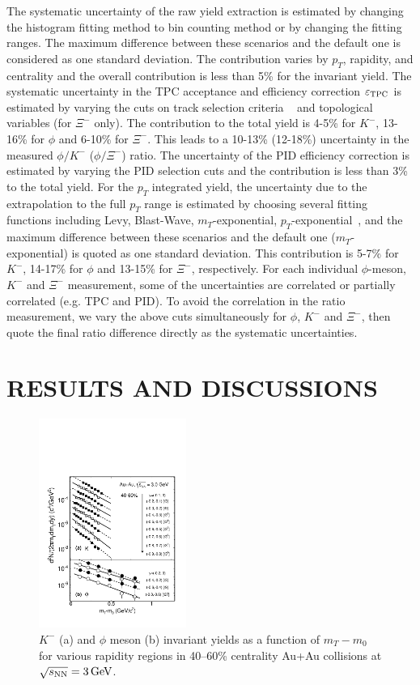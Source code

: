 \documentclass[aps,tightenlines,superscriptaddress,twocolumn]{revtex4-1}
\begin{document}
The systematic uncertainty of the raw yield extraction is estimated by changing the histogram fitting method to bin counting method or by changing the fitting ranges. The maximum difference between these scenarios and the default one is considered as one standard deviation. The contribution varies by $p_T$, rapidity, and centrality and the overall contribution is less than 5\% for the invariant yield. The systematic uncertainty in the TPC acceptance and efficiency correction $\varepsilon_{\rm TPC}$ is estimated by varying the cuts on track selection criteria ~\cite{Adamczyk:2017iwn} and topological variables (for $\Xi^-$ only). The contribution to the total yield is 4-5\% for $K^-$, 13-16\% for $\phi$ and 6-10\% for $\Xi^-$. This leads to a 10-13\% (12-18\%) uncertainty in the measured $\phi/K^-$ ($\phi/\Xi^-$) ratio. The uncertainty of the PID efficiency correction is estimated by varying the PID selection cuts and the contribution is less than 3\% to the total yield.
For the $p_T$ integrated yield, the uncertainty due to the extrapolation to the full $p_T$ range is estimated by choosing several fitting functions including Levy, Blast-Wave, $m_T$-exponential, $p_T$-exponential~\cite{STAR_particleYield:2009}, and the maximum difference between these scenarios and the default one ($m_T$-exponential) is quoted as one standard deviation. This contribution is 5-7\% for $K^-$, 14-17\% for $\phi$ and 13-15\% for $\Xi^-$, respectively. For each individual $\phi$-meson, $K^-$ and $\Xi^-$ measurement, some of the uncertainties are correlated or partially correlated (e.g. TPC and PID). To avoid the correlation in the ratio measurement, we vary the above cuts simultaneously for $\phi$, $K^-$ and $\Xi^-$, then quote the final ratio difference directly as the systematic uncertainties.


\section{RESULTS AND DISCUSSIONS}
\label{results}


\begin{figure}
\centering
\hspace*{-10mm}
\includegraphics[width=0.43\textwidth]{fig23-eps-converted-to.pdf}
\caption{$K^-$ (a) and $\phi$ meson (b) invariant yields as a function of $m_T-m_0$ for various rapidity regions in 40--60\% centrality Au+Au collisions at ${\sqrt{s_{\rm NN}} = \rm{3\,GeV}}$.}
\label{fig:phimTSpectra23}
\end{figure}
\end{document}
